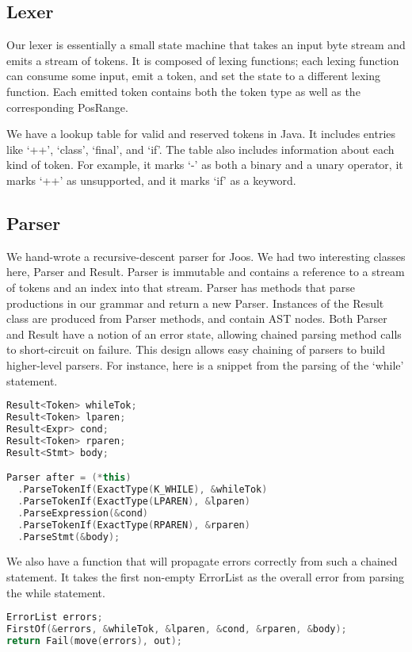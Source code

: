 \documentclass[12pt, titlepage]{article}
\begin{document}
\subsection{Lexer}
Our lexer is essentially a small state machine that takes an input byte stream
and emits a stream of tokens. It is composed of lexing functions; each lexing
function can consume some input, emit a token, and set the state to a different
lexing function. Each emitted token contains both the token type as well as the
corresponding PosRange.

We have a lookup table for valid and reserved tokens in Java. It includes
entries like `++', `class', `final', and `if'. The table also includes
information about each kind of token. For example, it marks `-' as both a
binary and a unary operator, it marks `++' as unsupported, and it marks `if' as
a keyword.

\subsection{Parser}
We hand-wrote a recursive-descent parser for Joos. We had two interesting
classes here, Parser and Result. Parser is immutable and contains a reference
to a stream of tokens and an index into that stream. Parser has methods that
parse productions in our grammar and return a new Parser. Instances of the
Result class are produced from Parser methods, and contain AST nodes. Both
Parser and Result have a notion of an error state, allowing chained parsing
method calls to short-circuit on failure. This design allows easy chaining of
parsers to build higher-level parsers. For instance, here is a snippet from the
parsing of the `while' statement.
\begin{lstlisting}[language=c++]
Result<Token> whileTok;
Result<Token> lparen;
Result<Expr> cond;
Result<Token> rparen;
Result<Stmt> body;

Parser after = (*this)
  .ParseTokenIf(ExactType(K_WHILE), &whileTok)
  .ParseTokenIf(ExactType(LPAREN), &lparen)
  .ParseExpression(&cond)
  .ParseTokenIf(ExactType(RPAREN), &rparen)
  .ParseStmt(&body);
\end{lstlisting}

We also have a function that will propagate errors correctly from such a
chained statement. It takes the first non-empty ErrorList as the overall
error from parsing the while statement.
\begin{lstlisting}[language=c++]
ErrorList errors;
FirstOf(&errors, &whileTok, &lparen, &cond, &rparen, &body);
return Fail(move(errors), out);
\end{lstlisting}
\end{document}
